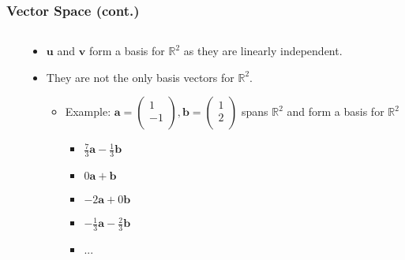 \documentclass[pdflatex, 12pt]{beamer}
\newcommand{\R}{\mathbb{R}}
\begin{document}
\begin{frame}
\frametitle{Vector Space (cont.)}
\begin{columns}
\begin{column}{0.5\textwidth}
\centering
{}
\end{column}
\begin{column}{0.5\textwidth}
\begin{itemize}
\item $\bm{u}$ and $\bm{v}$ form a basis for $\R^2$ as they are linearly independent.
\vspace{0.2cm}
\item They are not the only basis vectors for $\R^2$.
 \begin{itemize}
 \item Example: $\bm{a} = \begin{pmatrix}
 1 \\
 -1 \\
 \end{pmatrix}, \bm{b} = \begin{pmatrix}
 1 \\
 2 \\
 \end{pmatrix}$ spans $\R^2$ and form a basis for $\R^2$
 \begin{itemize}
 \item $\frac{7}{3}\bm{a} - \frac{1}{3}\bm{b}$
 \item $0\bm{a} + \bm{b}$
 \item $-2\bm{a} + 0\bm{b}$
 \item $-\frac{1}{3}\bm{a} - \frac{2}{3}\bm{b}$
 \item ...
 \end{itemize}
 \end{itemize}
\end{itemize}
\end{column}
\end{columns}
\end{frame}
\end{document}
